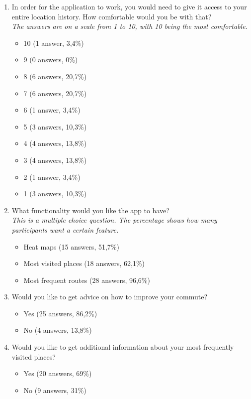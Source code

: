 \documentclass[12p]{article}
\begin{document}
\begin{enumerate}
		    \item In order for the application to work, you would need to give it access to your entire location history. How comfortable would you be with that?
		    \\\textit{The answers are on a scale from 1 to 10, with 10 being the most comfortable.}
		    \begin{itemize}
		        \item 10 (1 answer, 3,4\%)
		        \item 9 (0 answers, 0\%)
		        \item 8 (6 answers, 20,7\%)
		        \item 7 (6 answers, 20,7\%)
		        \item 6 (1 answer, 3,4\%)
		        \item 5 (3 answers, 10,3\%)
		        \item 4 (4 answers, 13,8\%)
		        \item 3 (4 answers, 13,8\%)
		        \item 2 (1 answer, 3,4\%)
		        \item 1 (3 answers, 10,3\%)
		    \end{itemize}

		    \item What functionality would you like the app to have?
		    \\\textit{This is a multiple choice question. The percentage shows how many participants want a certain feature.}
		    \begin{itemize}
		        \item Heat maps (15 answers, 51,7\%)
		        \item Most visited places (18 answers, 62,1\%)
		        \item Most frequent routes (28 answers, 96,6\%)
		    \end{itemize}
		    
		    \item Would you like to get advice on how to improve your commute?
		    \begin{itemize}
		        \item Yes (25 answers, 86,2\%)
		        \item No (4 answers, 13,8\%)
		    \end{itemize}
		    
		    \item Would you like to get additional information about your most frequently visited places?
		    \begin{itemize}
		        \item Yes (20 answers, 69\%)
		        \item No (9 answers, 31\%)
		    \end{itemize}
		\end{enumerate}
		
		
\end{document}
